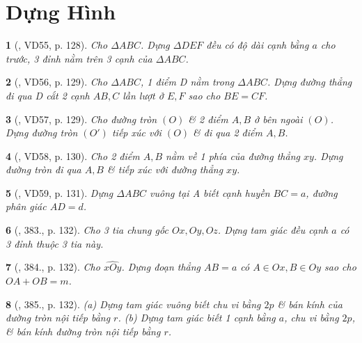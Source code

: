 \documentclass{article}
\newtheorem{baitoan}{}
\begin{document}

\section{Dựng Hình}

\begin{baitoan}[\cite{Binh_Toan_9_tap_2}, VD55, p. 128]
	Cho $\Delta ABC$. Dựng $\Delta DEF$ đều có độ dài cạnh bằng $a$ cho trước, 3 đỉnh nằm trên 3 cạnh của $\Delta ABC$.
\end{baitoan}

\begin{baitoan}[\cite{Binh_Toan_9_tap_2}, VD56, p. 129]
	Cho $\Delta ABC$, 1 điểm D nằm trong $\Delta ABC$. Dựng đường thẳng đi qua D cắt 2 cạnh $AB,C$ lần lượt ở $E,F$ sao cho $BE = CF$.
\end{baitoan}

\begin{baitoan}[\cite{Binh_Toan_9_tap_2}, VD57, p. 129]
	Cho đường tròn $(O)$ \& 2 điểm $A,B$ ở bên ngoài $(O)$. Dựng đường tròn $(O')$ tiếp xúc với $(O)$ \& đi qua 2 điểm $A,B$.
\end{baitoan}

\begin{baitoan}[\cite{Binh_Toan_9_tap_2}, VD58, p. 130]
	Cho 2 điểm $A,B$ nằm về 1 phía của đường thẳng $xy$. Dựng đường tròn đi qua $A,B$ \& tiếp xúc với đường thẳng $xy$.
\end{baitoan}
\begin{baitoan}[\cite{Binh_Toan_9_tap_2}, VD59, p. 131]
	Dựng $\Delta ABC$ vuông tại A biết cạnh huyền $BC = a$, đường phân giác $AD = d$.
\end{baitoan}

\begin{baitoan}[\cite{Binh_Toan_9_tap_2}, 383., p. 132]
	Cho 3 tia chung gốc $Ox,Oy,Oz$. Dựng tam giác đều cạnh $a$ có 3 đỉnh thuộc 3 tia này.
\end{baitoan}

\begin{baitoan}[\cite{Binh_Toan_9_tap_2}, 384., p. 132]
	Cho $\widehat{xOy}$. Dựng đoạn thẳng $AB = a$ có $A\in Ox,B\in Oy$ sao cho $OA + OB = m$.
\end{baitoan}

\begin{baitoan}[\cite{Binh_Toan_9_tap_2}, 385., p. 132]
	(a) Dựng tam giác vuông biết chu vi bằng $2p$ \& bán kính của đường tròn nội tiếp bằng $r$. (b) Dựng tam giác biết 1 cạnh bằng $a$, chu vi bằng $2p$, \& bán kính đường tròn nội tiếp bằng $r$.
\end{baitoan}
\end{document}
